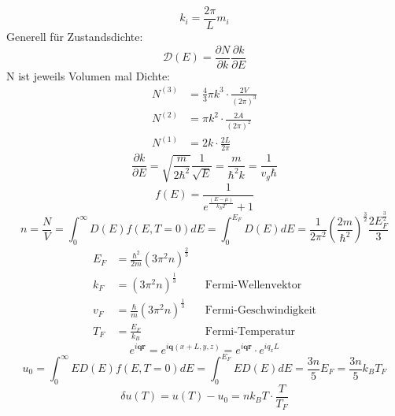 \documentclass[11pt]{article}
\begin{document}
\begin{equation}
  k_i=\frac{2\pi}{L}m_i
\end{equation}
Generell für Zustandsdichte:
\begin{equation}
  \mathcal{D}(E)=\frac{\partial N}{\partial k}\frac{\partial k}{\partial E}
\end{equation}
N ist jeweils Volumen mal Dichte:
\begin{equation}
  \begin{align}
    N^{(3)}&=\frac{4}{3}\pi k^3\cdot\frac{2V}{(2\pi)^3} \\
    N^{(2)}&=\pi k^2\cdot\frac{2A}{(2\pi)^2} \\
    N^{(1)}&=2k\cdot\frac{2L}{2\pi}
  \end{align}
\end{equation}
\begin{equation}
  \frac{\partial k}{\partial E}=\sqrt{\frac{m}{2\hbar^2}}\frac{1}{\sqrt{E}}=
  \frac{m}{\hbar^2k}=\frac{1}{v_g\hbar}
\end{equation}
\begin{equation}
  f(E)=\frac{1}{e^{\frac{(E-\mu)}{k_BT}}+1}
\end{equation}
\begin{equation}
  n=\frac{N}{V}=\int_0^\infty D(E)f(E,T=0)dE=\int_0^{E_F}D(E)dE=\frac{1}{2\pi^2}
  \left( \frac{2m}{\hbar^2}\right)^{\frac{3}{2}}\frac{2E_F^{\frac{3}{2}}}{3}
\end{equation}
\begin{equation}
  \begin{align}
    E_F&=\frac{\hbar^2}{2m}(3\pi^2n)^{\frac{2}{3}} \\
    k_F&=(3\pi^2n)^{\frac{1}{3}}\quad &\text{Fermi-Wellenvektor} \\
    v_F&=\frac{\hbar}{m}(3\pi^2n)^{\frac{1}{3}}\quad &\text{Fermi-Geschwindigkeit} \\
    T_F&=\frac{E_F}{k_B}\quad &\text{Fermi-Temperatur}
  \end{align}
\end{equation}
\begin{equation}
  e^{i\bm{q}\bm{r}}=e^{i\bm{q}(x+L,y,z)}=e^{i\bm{q}\bm{r}}\cdot e^{iq_xL}
\end{equation}
\begin{equation}
  u_0=\int_0^\infty ED(E)f(E,T=0)dE=\int_0^{E_F}ED(E)dE=\frac{3n}{5}E_F=
  \frac{3n}{5}k_BT_F
\end{equation}
\begin{equation}
  \delta u(T)=u(T)-u_0=nk_BT\cdot\frac{T}{T_F}
\end{equation}
\end{document}

